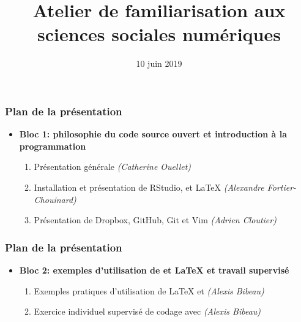 \documentclass{beamer}
\title{Atelier de familiarisation aux sciences sociales numériques}
\date{10 juin 2019}
\begin{document}

	\frame{\titlepage}


\begin{frame}
      \frametitle{Plan de la présentation}
      \begin{itemize}
        \item \textbf{Bloc 1: philosophie du code source ouvert et introduction à la programmation}
          \begin{enumerate}
            \item Présentation générale \textit{(Catherine Ouellet)}
            \item Installation et présentation de RStudio, \R et \LaTeX{} \textit{(Alexandre Fortier-Chouinard)}
            \item Présentation de Dropbox, GitHub, Git et Vim \textit{(Adrien Cloutier)}
          \end{enumerate}
        \end{itemize}
    \end{frame}
    
    \begin{frame}
      \frametitle{Plan de la présentation}
        \begin{itemize}
        \item \textbf{Bloc 2: exemples d'utilisation de \R et \LaTeX{} et travail supervisé}
          \begin{enumerate}
            \item Exemples pratiques d'utilisation de \LaTeX{} et \R \textit{(Alexis Bibeau)}
            \item Exercice individuel supervisé de codage avec \R \textit{(Alexis Bibeau)}
          \end{enumerate}
      \end{itemize}
    \end{frame}
    
\end{document}
